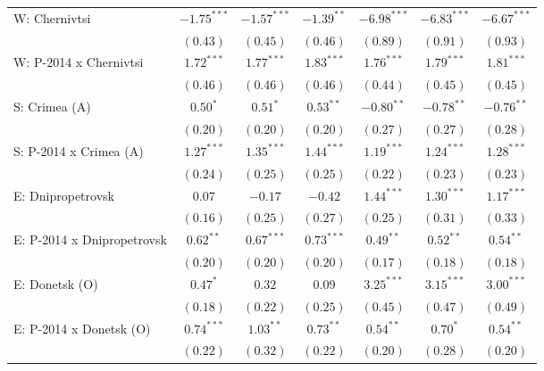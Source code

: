 \begin{table}
\begin{center}
\begin{small}
\begin{tabular}{l c c c c c c}
W: Chernivtsi               & $-1.75^{***}$ & $-1.57^{***}$ & $-1.39^{**}$   & $-6.98^{***}$ & $-6.83^{***}$ & $-6.67^{***}$ \\
                            & $(0.43)$      & $(0.45)$      & $(0.46)$       & $(0.89)$      & $(0.91)$      & $(0.93)$      \\
W: P-2014 x Chernivtsi      & $1.72^{***}$  & $1.77^{***}$  & $1.83^{***}$   & $1.76^{***}$  & $1.79^{***}$  & $1.81^{***}$  \\
                            & $(0.46)$      & $(0.46)$      & $(0.46)$       & $(0.44)$      & $(0.45)$      & $(0.45)$      \\
S: Crimea (A)               & $0.50^{*}$    & $0.51^{*}$    & $0.53^{**}$    & $-0.80^{**}$  & $-0.78^{**}$  & $-0.76^{**}$  \\
                            & $(0.20)$      & $(0.20)$      & $(0.20)$       & $(0.27)$      & $(0.27)$      & $(0.28)$      \\
S: P-2014 x Crimea (A)      & $1.27^{***}$  & $1.35^{***}$  & $1.44^{***}$   & $1.19^{***}$  & $1.24^{***}$  & $1.28^{***}$  \\
                            & $(0.24)$      & $(0.25)$      & $(0.25)$       & $(0.22)$      & $(0.23)$      & $(0.23)$      \\
E: Dnipropetrovsk           & $0.07$        & $-0.17$       & $-0.42$        & $1.44^{***}$  & $1.30^{***}$  & $1.17^{***}$  \\
                            & $(0.16)$      & $(0.25)$      & $(0.27)$       & $(0.25)$      & $(0.31)$      & $(0.33)$      \\
E: P-2014 x Dnipropetrovsk  & $0.62^{**}$   & $0.67^{***}$  & $0.73^{***}$   & $0.49^{**}$   & $0.52^{**}$   & $0.54^{**}$   \\
                            & $(0.20)$      & $(0.20)$      & $(0.20)$       & $(0.17)$      & $(0.18)$      & $(0.18)$      \\
E: Donetsk (O)              & $0.47^{*}$    & $0.32$        & $0.09$         & $3.25^{***}$  & $3.15^{***}$  & $3.00^{***}$  \\
                            & $(0.18)$      & $(0.22)$      & $(0.25)$       & $(0.45)$      & $(0.47)$      & $(0.49)$      \\
E: P-2014 x Donetsk (O)     & $0.74^{***}$  & $1.03^{**}$   & $0.73^{**}$    & $0.54^{**}$   & $0.70^{*}$    & $0.54^{**}$   \\
                            & $(0.22)$      & $(0.32)$      & $(0.22)$       & $(0.20)$      & $(0.28)$      & $(0.20)$      \\

\end{tabular}
\end{small}
\end{center}
\end{table}

